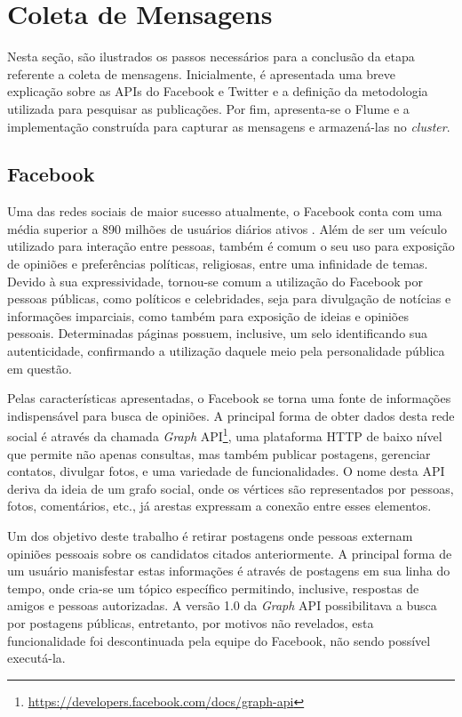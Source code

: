 \section{Coleta de Mensagens}
\label{sec:coleta-imp}

Nesta seção, são ilustrados os passos necessários para a conclusão da etapa referente a coleta de mensagens. Inicialmente, é apresentada uma breve explicação sobre as APIs do Facebook e Twitter e a definição da metodologia utilizada para pesquisar as publicações. Por fim, apresenta-se o Flume e a implementação construída para capturar as mensagens e armazená-las no \textit{cluster}.

\subsection{Facebook}

Uma das redes sociais de maior sucesso atualmente, o Facebook conta com uma média superior a 890 milhões de usuários diários ativos \cite{facebook-doc}. Além de ser um veículo utilizado para interação entre pessoas, também é comum o seu uso para exposição de opiniões e preferências políticas, religiosas, entre uma infinidade de temas. Devido à sua expressividade, tornou-se comum a utilização do Facebook por pessoas públicas, como políticos e celebridades, seja para divulgação de notícias e informações imparciais, como também para exposição de ideias e opiniões pessoais. Determinadas páginas possuem, inclusive, um selo identificando sua autenticidade, confirmando a utilização daquele meio pela personalidade pública em questão.

Pelas características apresentadas, o Facebook se torna uma fonte de informações indispensável para busca de opiniões. A principal forma de obter dados desta rede social é através da chamada \textit{Graph} API\footnote{\url{https://developers.facebook.com/docs/graph-api}}, uma plataforma HTTP de baixo nível que permite não apenas consultas, mas também publicar postagens, gerenciar contatos, divulgar fotos, e uma variedade de funcionalidades. O nome desta API deriva da ideia de um grafo social, onde os vértices são representados por pessoas, fotos, comentários, etc., já arestas expressam a conexão entre esses elementos.

Um dos objetivo deste trabalho é retirar postagens onde pessoas externam opiniões pessoais sobre os candidatos citados anteriormente. A principal forma de um usuário manisfestar estas informações é através de postagens em sua linha do tempo, onde cria-se um tópico específico permitindo, inclusive, respostas de amigos e pessoas autorizadas. A versão 1.0 da \textit{Graph} API possibilitava a busca por postagens públicas, entretanto, por motivos não revelados, esta funcionalidade foi descontinuada pela equipe do Facebook, não sendo possível executá-la.

